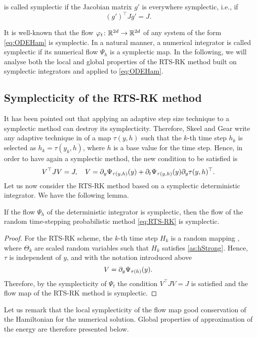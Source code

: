 \documentclass[10pt]{article}
\begin{document}
\begin{definition}  is called symplectic if the Jacobian matrix $g'$ is everywhere symplectic, i.e., if
	\begin{equation}\label{eq:SymplecticMap}
	(g')^\top J g' = J.
	\end{equation}	
\end{definition}
It is well-known that the flow $\phi_t\colon\R^{2d}\to\R^{2d}$ of any system of the form \eqref{eq:ODEHam} is symplectic. In a natural manner, a numerical integrator is called symplectic if its numerical flow $\Psi_h$ is a symplectic map. In the following, we will analyse both the local and global properties of the RTS-RK method built on symplectic integrators and applied to \eqref{eq:ODEHam}.

\subsection{Symplecticity of the RTS-RK method} It has been pointed out  that applying an adaptive step size technique to a symplectic method can destroy its symplecticity. Therefore, Skeel and Gear \cite{SkG92} write any adaptive technique in  of a map $\tau(y, h)$ such that the $k$-th time step $h_k$ is selected as $h_k = \tau(y_k, h)$, where $h$ is a base value for the time step. Hence, in order to have again a symplectic method, the new condition to be satisfied is
\begin{equation}\label{eq:SymplecticCondition}
V^\top J V = J, \quad V = \pdv{\Psi_{\tau(y, h)}(y)}{y} + \pdv{\Psi_{\tau(y, h)}(y)}{t}\pdv{\tau(y, h)}{y}^\top.
\end{equation}
Let us now consider the RTS-RK method based on a symplectic deterministic integrator. We have the following lemma. 
\begin{lemma}\label{lem:SympRTSRK} If the flow $\Psi_h$ of the deterministic integrator is symplectic, then the flow of the random time-stepping probabilistic method \eqref{eq:RTS-RK} is symplectic.
\end{lemma}
\begin{proof} For the RTS-RK scheme, the $k$-th time step $H_k$ is  a random mapping , where $\Theta_k$ are  scaled random variables such that $H_k$ satisfies \cref{as:hStrong}. Hence, $\tau$ is independent of $y$,  and with the notation introduced above 
	\begin{equation}
	V = \pdv{\Psi_{\tau(h)}(y)}{y}.
	\end{equation}
	Therefore, by the symplecticity of $\Psi_t$ the condition $V^\top J V = J$ is satisfied and the flow map of the RTS-RK method is symplectic.
\end{proof}
Let us remark that the local symplecticity of the flow map  good conservation of the Hamiltonian for the numerical solution. Global properties of approximation of the energy are therefore presented below.
\end{document}
